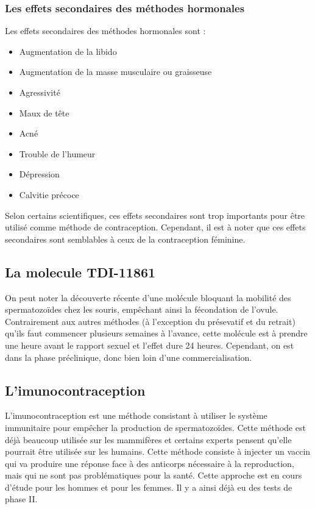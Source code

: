 \documentclass[12pt,a4paper]{report}
\begin{document}
\subsubsection{Les effets secondaires des méthodes hormonales} \label{effets-secondaires-methodes-hormonales}

Les effets secondaires des méthodes hormonales sont :
\begin{itemize}
    \item Augmentation de la libido
    \item Augmentation de la masse musculaire ou graisseuse
    \item Agressivité
    \item Maux de tête
    \item Acné
    \item Trouble de l'humeur
    \item Dépression
    \item Calvitie précoce \cites{guillaumedaudinContraceptesEnqueteDernier2022}{anne-sophiedelcourHommeSousPilule}{ContraceptionHormonaleMasculine2016}
\end{itemize}

Selon certains scientifiques, ces effets secondaires sont trop importants pour être utilisé comme méthode de contraception. Cependant, il est à noter que ces effets secondaires sont semblables à ceux de la contraception féminine. \cite{ContraceptionHormonaleMasculine2016}

\subsection{La molecule TDI-11861}

On peut noter la découverte récente d'une molécule bloquant la mobilité des spermatozoïdes chez les souris, empêchant ainsi la fécondation de l'ovule.
Contrairement aux autres méthodes (à l'exception du présevatif et du retrait) qu'ils faut commencer plusieurs semaines à l'avance, cette molécule est à prendre une heure avant le rapport sexuel et l'effet dure 24 heures. \cite{balbachOndemandMaleContraception2023}
Cependant, on est dans la phase préclinique, donc bien loin d'une commercialisation. \cite{DeveloppementMedicamentInserm}

\subsection{L'imunocontraception} \label{section:imunocontraception}

L'imunocontraception est une méthode consistant à utiliser le système immunitaire pour empêcher la production de spermatozoïdes.
Cette méthode est déjà beaucoup utilisée sur les mammifères et certains experts pensent qu'elle pourrait être utilisée sur les humains. \cite{ImmunocontraceptionWikipedia}
Cette méthode consiste à injecter un vaccin qui va produire une réponse face à des anticorps nécessaire à la reproduction, mais qui ne sont pas problématiques pour la santé.
Cette approche est en cours d'étude pour les hommes et pour les femmes. Il y a ainsi déjà eu des tests de phase II. \cite{mclaughlinThereRoleImmunocontraception2011}
\end{document}
